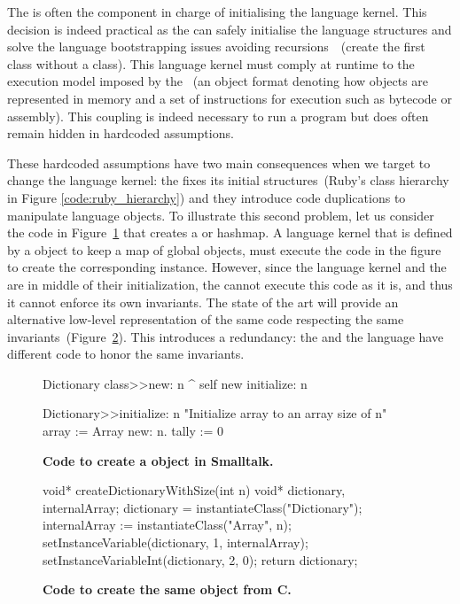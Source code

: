 The \VM is often the component in charge of initialising the language kernel. This decision is indeed practical as the \VM can safely initialise the language structures and solve the language bootstrapping issues avoiding recursions~\cite{Kicz91a}~(\eg create the first class without a class). This language kernel must comply at runtime to the execution model imposed by the \VM~(\eg an object format denoting how objects are represented in memory and a set of instructions for execution such as bytecode or assembly). This coupling is indeed necessary to run a program but does often remain hidden in hardcoded assumptions.

These hardcoded \VM assumptions have two main consequences when we target to change the language kernel: the \VM fixes its initial structures~(\eg Ruby's class hierarchy in Figure \ref{code:ruby_hierarchy}) and they introduce code duplications to manipulate language objects.
To illustrate this second problem, let us consider the code in Figure~\ref{code:logic_dup} that creates a  or hashmap. A language kernel that is defined by a  object to keep \eg a map of global objects, must execute the code in the figure to create the corresponding instance. However, since the language kernel and the \VM are in middle of their initialization, the \VM cannot execute this code as it is, and thus it cannot enforce its own invariants. The state of the art \VMs will provide an alternative low-level representation of the same code respecting the same invariants~(Figure~\ref{code:logic_dup2}). This introduces a redundancy: the \VM and the language have different code to honor the same invariants.

\begin{figure}[ht]
\begin{code}
Dictionary class>>new: n
    ^ self new initialize: n

Dictionary>>initialize: n
    "Initialize array to an array size of n"
    array := Array new: n.
    tally := 0
\end{code}
\caption{\textbf{Code to create a  object in Smalltalk.}\label{code:logic_dup}}
\end{figure}

\begin{figure}[ht]
\begin{code}
void* createDictionaryWithSize(int n){
    void* dictionary, internalArray;
    dictionary = instantiateClass("Dictionary");
    internalArray := instantiateClass("Array", n);
    setInstanceVariable(dictionary, 1, internalArray);
    setInstanceVariableInt(dictionary, 2, 0);
    return dictionary;
}
\end{code}
\caption{\textbf{Code to create the same  object from C.}\label{code:logic_dup2}}
\end{figure}


